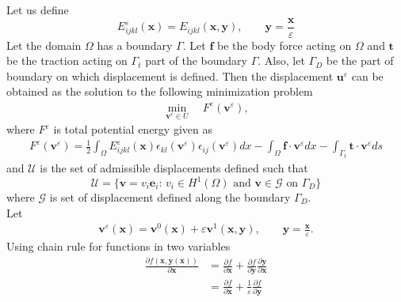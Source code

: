 \documentclass[openright,twoside]{iitkthesis}
\newcommand{\e}[1]{\textbf{#1}}
\begin{document}
Let us define
\begin{equation}
E_{ijkl}^\varepsilon (\textbf{x}) = E_{ijkl}(\textbf{x},\textbf{y}), \qquad \textbf{y} = \frac{\textbf{x}}{\varepsilon}
\end{equation}
Let the domain $\Omega$ has a boundary $\Gamma$. Let $\textbf{f}$ be the body force acting on $\Omega$ and $\textbf{t}$ be the traction acting on $\Gamma_t$ part of the boundary $\Gamma$. Also, let $\Gamma_D$ be the part of boundary on which displacement is defined. Then the displacement $\textbf{u}^\varepsilon$ can be obtained as the solution to the following minimization problem
\begin{align}
\label{fem}
\min_{\textbf{v}^\varepsilon\in U} \quad F^\varepsilon(\textbf{v}^\varepsilon),
\end{align} 
where $F^\varepsilon$ is total potential energy given as    
\begin{eqnarray} \label{tpe}
F^\varepsilon(\textbf{v}^\varepsilon) = \frac{1}{2}\int_\Omega E^\varepsilon_{ijkl}(\e x)\epsilon_{kl}(\textbf{v}^\varepsilon)\epsilon_{ij}(\textbf{v}^\varepsilon)dx-\int_\Omega\textbf{f}\cdot\textbf{v}^\varepsilon dx - \int_{\Gamma_t}\textbf{t}\cdot\textbf{v}^\varepsilon ds
\end{eqnarray}
and $\mathcal{U}$ is the set of admissible displacements defined such that
\begin{equation}
\mathcal{U} = \{\textbf{v} = v_i\textbf{e}_i :\, v_i\in H^1(\Omega) \text{ and } \textbf{v}\in\mathcal{G} \text{ on } \Gamma_D\}
\end{equation}
where $\mathcal{G}$ is set of displacement defined along the boundary $\Gamma_D$.\\
Let 
\begin{align}
\textbf{v}^\varepsilon(\textbf{x}) = \textbf{v}^0(\textbf{x})+\varepsilon\textbf{v}^1(\textbf{x},\textbf{y}),\qquad \textbf{y}=\frac{\textbf{x}}{\varepsilon}.
\end{align}
Using chain rule for functions in two variables\\
\begin{equation}
\begin{split}
\frac{\partial f(\e x, \e y(\e x))}{\partial \textbf{x}} &= \frac{\partial f}{\partial \textbf{x}}+\frac{\partial f}{\partial \textbf{y}}\frac{\partial \textbf{y}}{\partial \textbf{x}}\\
&=\frac{\partial f}{\partial \textbf{x}}+\frac{1}{\varepsilon}\frac{\partial f}{\partial \textbf{y}}
\end{split}
\end{equation}
\end{document}
